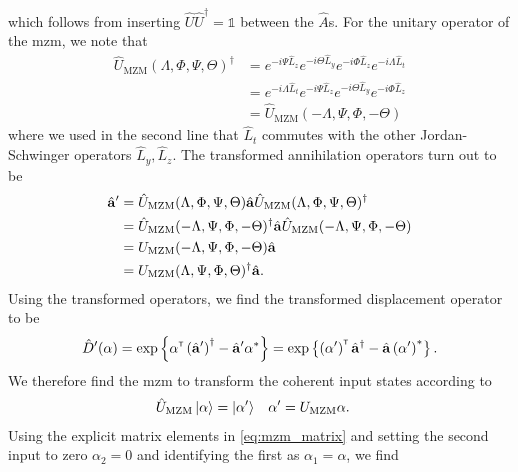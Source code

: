 which follows from inserting $\hat{U}\hat{U}^\dagger=\mathbb{1}$ between the $\hat{A}$s.
For the unitary operator of the \gls{mzm}, we note that
\begin{equation}
	\begin{split}
		\hat{U}_\text{MZM}(\Lambda,\Phi,\Psi,\Theta)^\dagger
		&=
		e^{-i\Psi\hat{L}_z}
		e^{-i\Theta\hat{L}_y}
		e^{-i\Phi\hat{L}_z}
		e^{-i\Lambda\hat{L}_t}
		\\
		&=
		e^{-i\Lambda\hat{L}_t}
		e^{-i\Psi\hat{L}_z}
		e^{-i\Theta\hat{L}_y}
		e^{-i\Phi\hat{L}_z}
		\\
		&=
		\hat{U}_\text{MZM}(-\Lambda,\Psi,\Phi,-\Theta)
	\end{split}
\end{equation}
where we used in the second line that $\hat{L}_t$ commutes with the other Jordan-Schwinger operators $\hat{L}_y,\hat{L}_z$.
The transformed annihilation operators turn out to be
\begin{equation}
	\begin{split}
		\hat{\vb{a}}^\prime
		&=
		\hat{U}_\text{MZM}(\Lambda,\Phi,\Psi,\Theta)
		\hat{\vb{a}}
		\hat{U}_\text{MZM}(\Lambda,\Phi,\Psi,\Theta)^\dagger
		\\
		&=
		\hat{U}_\text{MZM}(-\Lambda,\Psi,\Phi,-\Theta)^\dagger
		\hat{\vb{a}}
		\hat{U}_\text{MZM}(-\Lambda,\Psi,\Phi,-\Theta)
		\\
		&=
		U_\text{MZM}(-\Lambda,\Psi,\Phi,-\Theta)
		\hat{\vb{a}}
		\\
		&=
		U_\text{MZM}(\Lambda,\Psi,\Phi,\Theta)^\dagger
		\hat{\vb{a}}
		.
	\end{split}
\end{equation}
Using the transformed operators, we find the transformed displacement operator to be~\cite[p.~210]{Vogel2006}
\begin{equation}
	\hat{D}^\prime(\vb{\alpha})
	=
	\exp\left\{
		\vb{\alpha}^{\scriptscriptstyle\mathsf{T}}
		\left(\hat{\vb{a}}^\prime\right)^\dagger
		-
		\hat{\vb{a}}^\prime
		\vb{\alpha}^*
	\right\}
	=
	\exp\left\{
		\left(\vb{\alpha}^\prime\right)^{\scriptscriptstyle\mathsf{T}}
		\hat{\vb{a}}^\dagger
		-
		\hat{\vb{a}}
		\left(\vb{\alpha}^\prime\right)^*
	\right\}
	.
\end{equation}
We therefore find the \gls{mzm} to transform the coherent input states according to
\begin{align}
	\hat{U}_\text{MZM}
	\ket{\vb{\alpha}}
	&=
	\ket{\vb{\alpha}^\prime}
	&
	\vb{\alpha}^\prime
	&=
	U_\text{MZM}
	\vb{\alpha}
	.
\end{align}
Using the explicit matrix elements in \cref{eq:mzm_matrix} and setting the second input to zero $\alpha_2=0$ and identifying the first as $\alpha_1=\alpha$, we find
